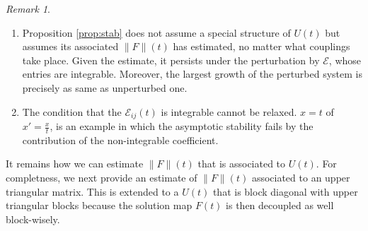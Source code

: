 \documentclass[a4paper,11pt]{article}
\theoremstyle{remark}
\newtheorem{remark}{Remark}[section]
\begin{document}
\begin{remark}
 \begin{enumerate}
  \item Proposition \ref{prop:stab} does not assume a special structure of $U(t)$ but assumes its associated $\|F\|(t)$ has estimated, no matter what couplings take place. Given the estimate, it persists under the perturbation by $\mathcal{E}$, whose entries are integrable. Moreover, the largest growth of the perturbed system is precisely as same as unperturbed one.
  \item The condition that the $\mathcal{E}_{ij}(t)$ is integrable cannot be relaxed. $x=t$ of  $x'=\frac{x}{t}$, is an example in which the asymptotic stability fails by the contribution of the non-integrable coefficient.
 \end{enumerate}
\end{remark}

It remains how we can estimate $\|F\|(t)$ that is associated to $U(t)$. For completness, we next provide an estimate of $\|F\|(t)$ associated to an upper triangular matrix. This is extended to a $U(t)$ that is block diagonal with upper triangular blocks because the solution map $F(t)$ is then decoupled as well block-wisely.
\end{document}
